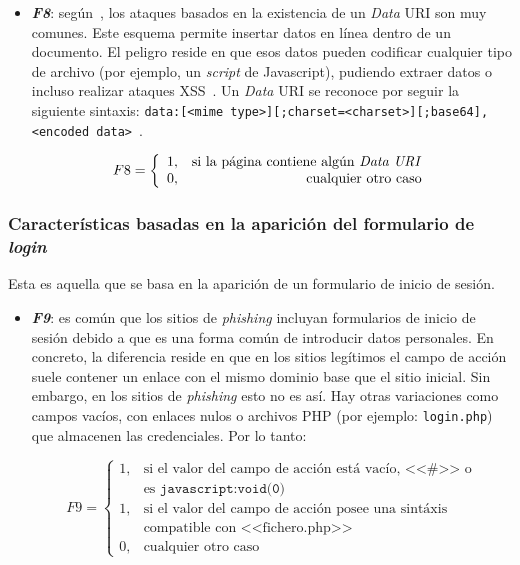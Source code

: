 \begin{itemize}
	\item \textit{\textbf{F8}}: según~\cite{featuresPhishing2018Gupta}, los ataques basados en la existencia de un \textit{Data} URI son muy comunes. Este esquema permite insertar datos en línea dentro de un documento. El peligro reside en que esos datos pueden codificar cualquier tipo de archivo (por ejemplo, un \textit{script} de Javascript), pudiendo extraer datos o incluso realizar ataques XSS~\cite{dataUri2020neoguias}. Un \textit{Data} URI se reconoce por seguir la siguiente sintaxis: \texttt{data:[<mime type>][;charset=<charset>][;base64],<encoded data>}~\cite{dataUri2010csstrick}.
	
	\[F8 = \left\{ \begin{array}{lr} 1, & \text{si la página contiene algún \textit{Data URI}}\\ 
		0, & \text{\raggedright cualquier otro caso} \label{eqn:phishing_f8} \end{array} \right. \]
\end{itemize}

\subsubsection{Características basadas en la aparición del formulario de \textit{login}}
Esta es aquella que se basa en la aparición de un formulario de inicio de sesión.

\begin{itemize}
	\item \textit{\textbf{F9}}: es común que los sitios de \textit{phishing} incluyan formularios de inicio de sesión debido a que es una forma común de introducir datos personales. En concreto, la diferencia reside en que en los sitios legítimos el campo de acción suele contener un enlace con el mismo dominio base que el sitio inicial. Sin embargo, en los sitios de \textit{phishing} esto no es así. Hay otras variaciones como campos vacíos, con enlaces nulos o archivos PHP (por ejemplo: \texttt{login.php}) que almacenen las credenciales. Por lo tanto:
	
	\[F9 = \left\{ \begin{array}{lr} 1, & \text{si el valor del campo de acción está vacío, <<\#>> o}\\ & \text{es } \texttt{javascript:void(0)}\\ 
		1, & \text{si el valor del campo de acción posee una sintáxis} \\ &  \text{compatible con <<fichero.php>>} \\
		0, & \text{cualquier otro caso} \label{eqn:phishing_f9} \end{array} \right. \]
\end{itemize}

